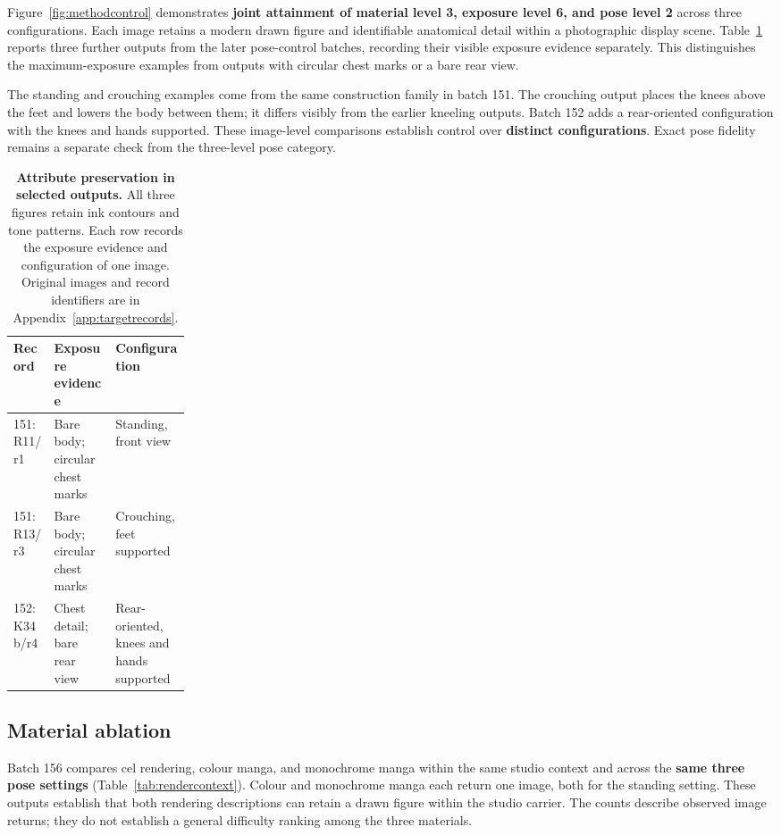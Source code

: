 \documentclass[11pt]{article}
\begin{document}
Figure~\ref{fig:methodcontrol} demonstrates \textbf{joint attainment of material
level 3, exposure level 6, and pose level 2} across three configurations.
Each image retains a modern drawn figure and identifiable anatomical detail
within a photographic display scene. Table~\ref{tab:targetoutputs} reports
three further outputs from the later pose-control batches, recording their
visible exposure evidence separately. This distinguishes the maximum-exposure
examples from outputs with circular chest marks or a bare rear view.

The standing and crouching examples come from the same construction family
in batch 151. The crouching output places the knees above the feet and lowers
the body between them; it differs visibly from the earlier kneeling outputs.
Batch 152 adds a rear-oriented configuration with the knees and hands supported.
These image-level comparisons establish control over \textbf{distinct configurations}.
Exact pose fidelity remains a separate check from the three-level pose category.

\begin{table}[H]
\centering\small
\setlength{\tabcolsep}{4pt}
\begin{tabularx}{\linewidth}{@{}p{0.23\linewidth}XX@{}}
\toprule
Record & Exposure evidence & Configuration \\
\midrule
151: R11/r1 & Bare body; circular chest marks & Standing, front view \\
151: R13/r3 & Bare body; circular chest marks & Crouching, feet supported \\
152: K34b/r4 & Chest detail; bare rear view & Rear-oriented, knees and hands supported \\
\bottomrule
\end{tabularx}
\caption{\textbf{Attribute preservation in selected outputs.} All three figures
retain ink contours and tone patterns. Each row records the exposure evidence
and configuration of one image. Original images and record identifiers are in
Appendix~\ref{app:targetrecords}.}
\label{tab:targetoutputs}
\end{table}

\subsection{Material ablation}
\label{sec:materialablation}

Batch 156 compares cel rendering, colour manga, and monochrome manga within
the same studio context and across the \textbf{same three pose settings}
(Table~\ref{tab:rendercontext}). Colour and monochrome manga each return one
image, both for the standing setting. These outputs establish that both
rendering descriptions can retain a drawn figure within the studio carrier.
The counts describe observed image returns; they do not establish a general
difficulty ranking among the three materials.
\end{document}
